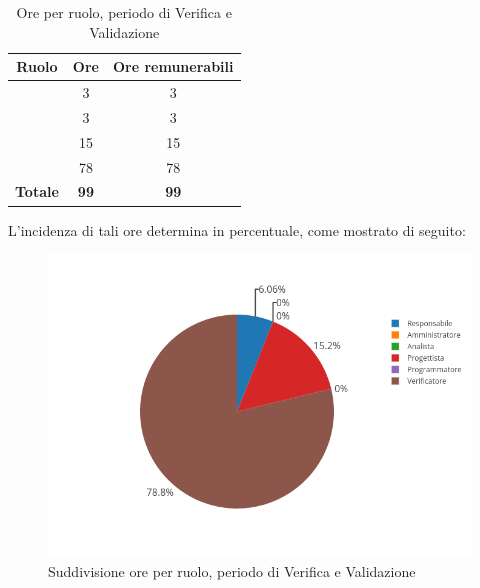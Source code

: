 \begin{table}[H]
	\begin{center}
		\begin{tabular}{|c|c|c|}
			\hline
			\textbf{Ruolo}	& \textbf{Ore}	& \textbf{Ore remunerabili} \\
			\hline
			\Res	&	3  &	3	\\
			\hline
			\Amm	&	3  &	3	\\
			\hline
			\Prog   &	15  &	15	\\
			\hline
			\Ver	&	78	&	78	\\
			\hline
			\textbf{Totale} & \textbf{99} & \textbf{99} \\
			\hline
		\end{tabular}
	\end{center}
	\caption{Ore per ruolo, periodo di Verifica e Validazione}
\end{table}

L'incidenza di tali ore determina in percentuale, come mostrato di seguito:
\begin{figure}[H]
	\centering
	\includegraphics[scale=0.6]{img/Validazione.png}
	\caption{Suddivisione ore per ruolo, periodo di Verifica e Validazione}
\end{figure}

